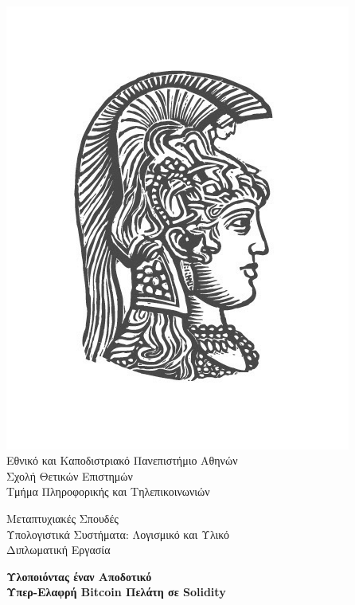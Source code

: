 \
\vspace{1.5cm}

\begin{center}
    \includegraphics[scale=0.8]{figures/logo_uoa.jpg}\\
    {\large Εθνικό και Καποδιστριακό Πανεπιστήμιο Αθηνών \\
    Σχολή Θετικών Επιστημών \\
    Τμήμα Πληροφορικής και Τηλεπικοινωνιών\\}
    \vspace{1cm}
    \begin{LARGE}
        Μεταπτυχιακές Σπουδές \\
        Υπολογιστικά Συστήματα: Λογισμικό και Υλικό\\
        \vspace{10mm}
        {Διπλωματική Εργασία}\\
        \vspace{0.8cm}
    \end{LARGE}
    {\textbf{\LARGE Υλοποιόντας έναν Αποδοτικό\\ Υπερ-Ελαφρή Bitcoin Πελάτη σε Solidity}}\\
    \vspace{2.5cm}



\end{center}
